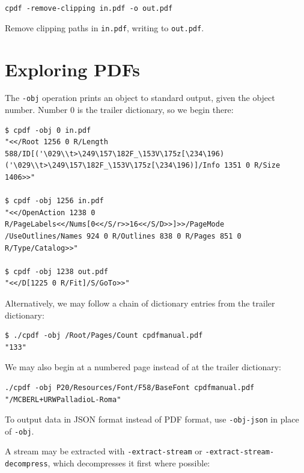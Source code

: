 \documentclass{book}
\begin{document}
  \begin{framed}
  \small\noindent\verb!cpdf -remove-clipping in.pdf -o out.pdf!

  \vspace{2.5mm}
  \noindent Remove clipping paths in \texttt{in.pdf}, writing to \texttt{out.pdf}. 
  \end{framed}

\section{Exploring PDFs}

\noindent The \texttt{-obj} operation prints an object to standard output, given the object number. Number 0 is the trailer dictionary, so we begin there:

{\small\begin{verbatim}
$ cpdf -obj 0 in.pdf
"<</Root 1256 0 R/Length 588/ID[('\029\\t>\249\157\182F_\153V\175z[\234\196)
('\029\\t>\249\157\182F_\153V\175z[\234\196)]/Info 1351 0 R/Size 1406>>"

$ cpdf -obj 1256 in.pdf
"<</OpenAction 1238 0 R/PageLabels<</Nums[0<</S/r>>16<</S/D>>]>>/PageMode
/UseOutlines/Names 924 0 R/Outlines 838 0 R/Pages 851 0 R/Type/Catalog>>"

$ cpdf -obj 1238 out.pdf
"<</D[1225 0 R/Fit]/S/GoTo>>"
\end{verbatim}}

\noindent Alternatively, we may follow a chain of dictionary entries from the trailer dictionary:

{\small\begin{verbatim}
$ ./cpdf -obj /Root/Pages/Count cpdfmanual.pdf
"133"
\end{verbatim}}

\noindent We may also begin at a numbered page instead of at the trailer dictionary:

{\small\begin{verbatim}
./cpdf -obj P20/Resources/Font/F58/BaseFont cpdfmanual.pdf
"/MCBERL+URWPalladioL-Roma"
\end{verbatim}}

\noindent To output data in JSON format instead of PDF format, use \texttt{-obj-json} in place of \texttt{-obj}.

A stream may be extracted with \texttt{-extract-stream} or \texttt{-extract-stream-decompress}, which decompresses it first where possible:
\end{document}
